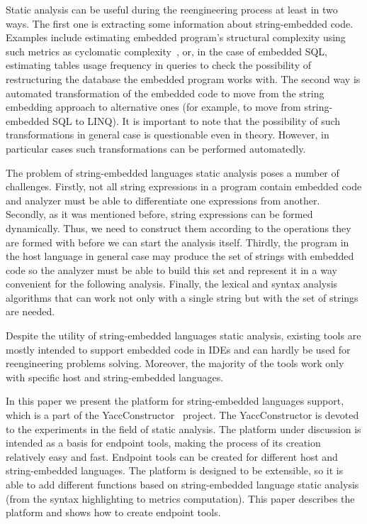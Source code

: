 \documentclass{sig-alternate-05-2015}
\begin{document}
Static analysis can be useful during the reengineering process at least in two ways. The first one is extracting some information about string-embedded code. Examples include estimating embedded program's structural complexity using such metrics as cyclomatic complexity~\cite{cyclomatic:ref}, or, in the case of embedded SQL, estimating tables usage frequency in queries to check the possibility of restructuring the database the embedded program works with. The second way is automated transformation of the embedded code to move from the string embedding approach to alternative ones (for example, to move from string-embedded SQL to LINQ). It is important to note that the possibility of such transformations in general case is questionable even in theory. However, in particular cases such transformations can be performed automatedly.

The problem of string-embedded languages static analysis poses a number of challenges. Firstly, not all string expressions in a program contain embedded code and analyzer must be able to differentiate one expressions from another. Secondly, as it was mentioned before, string expressions can be formed dynamically. Thus, we need to construct them according to the operations they are formed with before we can start the analysis itself. Thirdly, the program in the host language in general case may produce the set of strings with embedded code so the analyzer must be able to build this set and represent it in a way convenient for the following analysis. Finally, the lexical and syntax analysis algorithms that can work not only with a single string but with the set of strings are needed.

Despite the utility of string-embedded languages static analysis, existing tools are mostly intended to support embedded code in IDEs and can hardly be used for reengineering problems solving. Moreover, the majority of the tools work only with specific host and string-embedded languages.

In this paper we present the platform for string-embedded languages support, which is a part of the  YaccConstructor~\cite{YaccConstructor:ref} project. The YaccConstructor is devoted to the experiments in the field of static analysis. The platform under discussion is intended as a basis for endpoint tools, making the process of its creation relatively easy and fast. Endpoint tools can be created for different host and string-embedded languages. The platform is designed to be extensible, so it is able to add different functions based on string-embedded language static analysis (from the syntax highlighting to metrics computation). This paper describes the platform and shows how to create endpoint tools.
\end{document}
